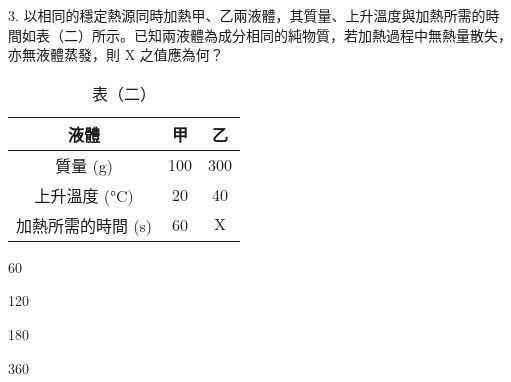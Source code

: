\documentclass[12pt]{article}
\begin{document}
\begin{problem}
  \item[3.] 以相同的穩定熱源同時加熱甲、乙兩液體，其質量、上升溫度與加熱所需的時間如表（二）所示。已知兩液體為成分相同的純物質，若加熱過程中無熱量散失，亦無液體蒸發，則 $\mathrm{X}$ 之值應為何？
  \begin{table}[ht]
    \centering
    \renewcommand{\arraystretch}{1.2}
    \vspace*{-1ex}
    \caption*{表（二）}
    \vspace*{-1ex}
    \begin{tabular}{|c|c|c|}
      \hline
      液體 & 甲 & 乙 \\ \hline
      質量 (\unit{\gram}) & 100 & 300 \\ \hline
      上升溫度 (\unit{\degreeCelsius}) & 20 & 40 \\ \hline
      加熱所需的時間 (\unit{\second}) & 60 & $\mathrm{X}$ \\ \hline
    \end{tabular}
    \vspace*{-2ex}
  \end{table}
  \begin{choices}
    \item 60
    \item 120
    \item 180
    \item 360
  \end{choices}
\end{problem}
\end{document}
